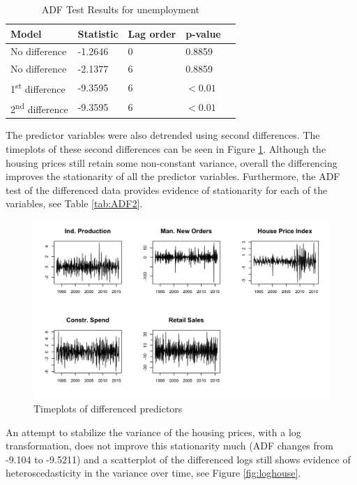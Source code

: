\documentclass[twoside,twocolumn]{article}
\begin{document}
		 \begin{table}[htb]
		 \centering
		 \caption{ADF Test Results for unemployment}
		 \label{tab:ADF}
		 \begin{tabular}{lllll}
		 \hline
		 \textbf{Model} 								& \textbf{Statistic} & \textbf{Lag order} 	& \textbf{p-value}\\ \hline
		 No  difference 								&   -1.2646 				& 0 								& 0.8859\\
		 No  difference 								&   -2.1377 				& 6 								& 0.8859\\
		 1\textsuperscript{st} difference 	&  -9.3595 				& 6 								&\( < 0.01\)\\
		 2\textsuperscript{nd} difference 	&  -9.3595 				& 6 								& \( < 0.01\)\\	 \hline
		 \end{tabular}
		 \end{table}
The predictor variables were also detrended using second differences. The timeplots of these second differences can be seen in Figure \ref{fig:statpred}. Although the housing prices still retain some non-constant variance, overall the differencing improves the stationarity of all the predictor variables.  Furthermore, the ADF test of the differenced data provides evidence of stationarity for each of the variables, see Table \ref{tab:ADF2}. 

		\begin{figure}[htb]
		\centering
		\caption{Timeplots of differenced predictors}
		\label{fig:statpred}
		\includegraphics[width=\linewidth]{images/StationaryPred}
		\end{figure}

An attempt to stabilize the variance of the housing prices, with a log transformation, does not improve this stationarity much (ADF changes from -9.104 to -9.5211) and a scatterplot of the differenced logs still shows evidence of heteroscedasticity in the variance over time, see Figure \ref{fig:loghouse}. 
\end{document}
